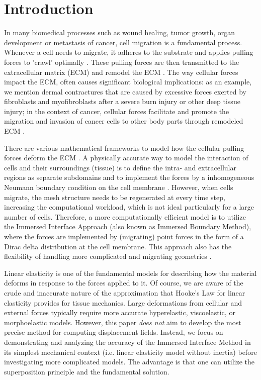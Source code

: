 \documentclass[pdflatex,sn-mathphys-num]{sn-jnl}
\newtheorem*{lemma star}{Lemma}
\begin{document}
\section{Introduction}
\label{sec: Introduction}
In many biomedical processes such as wound healing, tumor growth, organ development or metastasis of cancer, cell migration is a fundamental process. Whenever a cell needs to migrate, it adheres to the substrate and applies pulling forces to 'crawl' optimally \citep{DePascalis2017, Wang2023, Zheng2019}. These pulling forces are then transmitted to the extracellular matrix (ECM) and remodel the ECM \cite{Totsukawa2004, Schwartz2010, Lecuit2011}. The way cellular forces impact the ECM, often causes significant biological implications: as an example, we mention dermal contractures that are caused by excessive forces exerted by fibroblasts and myofibroblasts \citep{Bin_2011} after a severe burn injury or other deep tissue injury; in the context of cancer, cellular forces facilitate and promote the migration and invasion of cancer cells to other body parts through remodeled ECM \citep{Daphne_2013, Daphne_2021, DePascalis2017}. 

There are various mathematical frameworks to model how the cellular pulling forces deform the ECM \citep{Zheng2019, Peng_2022, Peng_2022_JCAM,ArellanoTint2025}. 
A physically accurate way to model the interaction of cells and their surroundings (tissue) is to define the intra- and extracellular regions as separate subdomains and to implement the forces by a inhomogeneous Neumann boundary condition on the cell membrane \citep{Peng_2022_JCAM}. However, when cells migrate, the mesh structure needs to be regenerated at every time step, increasing the computational workload, which is not ideal particularly for a large number of cells. Therefore, a more computationally efficient model is to utilize the Immersed Interface Approach \citep{Yuri_2025, roy2020immersed} (also known as Immersed Boundary Method), where the forces are implemented by (migrating) point forces in the form of a Dirac delta distribution at the cell membrane. This approach also has the flexibility of handling more complicated and migrating geometries \citep{Peng2020-lu, Peng_Cancer_2023,alvarez2024}.


Linear elasticity is one of the fundamental models for describing how the material deforms in response to the forces applied to it.
Of course, we are aware of the crude and inaccurate nature of the approximation that Hooke's Law for linear elasticity provides for tissue mechanics. Large deformations from cellular and external forces typically require more accurate hyperelastic, viscoelastic, or morphoelastic models.  
However, this paper \textit{does not} aim to develop the most precise method for computing displacement fields. Instead, we focus on demonstrating and analyzing the accuracy of the Immersed Interface Method in its simplest mechanical context (i.e. linear elasticity model without inertia) before investigating more complicated models. The advantage is that one can utilize the superposition principle and the fundamental solution.
\end{document}
